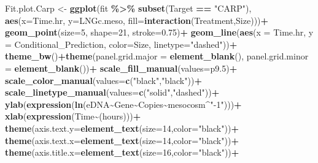 \documentclass[
]{article}
\newenvironment{Shaded}{\begin{snugshade}}{\end{snugshade}}
\newcommand{\AttributeTok}[1]{\textcolor[rgb]{0.13,0.29,0.53}{#1}}
\newcommand{\DecValTok}[1]{\textcolor[rgb]{0.00,0.00,0.81}{#1}}
\newcommand{\FloatTok}[1]{\textcolor[rgb]{0.00,0.00,0.81}{#1}}
\newcommand{\FunctionTok}[1]{\textcolor[rgb]{0.13,0.29,0.53}{\textbf{#1}}}
\newcommand{\NormalTok}[1]{#1}
\newcommand{\OtherTok}[1]{\textcolor[rgb]{0.56,0.35,0.01}{#1}}
\newcommand{\SpecialCharTok}[1]{\textcolor[rgb]{0.81,0.36,0.00}{\textbf{#1}}}
\newcommand{\StringTok}[1]{\textcolor[rgb]{0.31,0.60,0.02}{#1}}
\begin{document}
\begin{Shaded}
\begin{Highlighting}[]
\NormalTok{Fit.plot.Carp }\OtherTok{\textless{}{-}} \FunctionTok{ggplot}\NormalTok{(fit }\SpecialCharTok{\%\textgreater{}\%} \FunctionTok{subset}\NormalTok{(Target }\SpecialCharTok{==} \StringTok{"CARP"}\NormalTok{), }\FunctionTok{aes}\NormalTok{(}\AttributeTok{x=}\NormalTok{Time.hr, }\AttributeTok{y=}\NormalTok{LNGc.meso, }\AttributeTok{fill=}\FunctionTok{interaction}\NormalTok{(Treatment,Size)))}\SpecialCharTok{+}
  \FunctionTok{geom\_point}\NormalTok{(}\AttributeTok{size=}\DecValTok{5}\NormalTok{, }\AttributeTok{shape=}\DecValTok{21}\NormalTok{, }\AttributeTok{stroke=}\FloatTok{0.75}\NormalTok{)}\SpecialCharTok{+}
  \FunctionTok{geom\_line}\NormalTok{(}\FunctionTok{aes}\NormalTok{(}\AttributeTok{x =}\NormalTok{ Time.hr, }\AttributeTok{y =}\NormalTok{ Conditional\_Prediction, }\AttributeTok{color=}\NormalTok{Size, }\AttributeTok{linetype=}\StringTok{"dashed"}\NormalTok{))}\SpecialCharTok{+}
  \FunctionTok{theme\_bw}\NormalTok{()}\SpecialCharTok{+}\FunctionTok{theme}\NormalTok{(}\AttributeTok{panel.grid.major =} \FunctionTok{element\_blank}\NormalTok{(), }\AttributeTok{panel.grid.minor =} \FunctionTok{element\_blank}\NormalTok{())}\SpecialCharTok{+}
  \FunctionTok{scale\_fill\_manual}\NormalTok{(}\AttributeTok{values=}\NormalTok{p9}\FloatTok{.5}\NormalTok{)}\SpecialCharTok{+}
  \FunctionTok{scale\_color\_manual}\NormalTok{(}\AttributeTok{values=}\FunctionTok{c}\NormalTok{(}\StringTok{"black"}\NormalTok{,}\StringTok{"black"}\NormalTok{))}\SpecialCharTok{+}
  \FunctionTok{scale\_linetype\_manual}\NormalTok{(}\AttributeTok{values=}\FunctionTok{c}\NormalTok{(}\StringTok{"solid"}\NormalTok{,}\StringTok{"dashed"}\NormalTok{))}\SpecialCharTok{+}
  \FunctionTok{ylab}\NormalTok{(}\FunctionTok{expression}\NormalTok{(}\FunctionTok{ln}\NormalTok{(eDNA}\SpecialCharTok{\textasciitilde{}}\NormalTok{Gene}\SpecialCharTok{\textasciitilde{}}\NormalTok{Copies}\SpecialCharTok{\textasciitilde{}}\NormalTok{mesocosm}\SpecialCharTok{\^{}}\StringTok{"{-}1"}\NormalTok{)))}\SpecialCharTok{+}
  \FunctionTok{xlab}\NormalTok{(}\FunctionTok{expression}\NormalTok{(Time}\SpecialCharTok{\textasciitilde{}}\NormalTok{(hours)))}\SpecialCharTok{+}
  \FunctionTok{theme}\NormalTok{(}\AttributeTok{axis.text.y=}\FunctionTok{element\_text}\NormalTok{(}\AttributeTok{size=}\DecValTok{14}\NormalTok{,}\AttributeTok{color=}\StringTok{"black"}\NormalTok{))}\SpecialCharTok{+}
  \FunctionTok{theme}\NormalTok{(}\AttributeTok{axis.text.x=}\FunctionTok{element\_text}\NormalTok{(}\AttributeTok{size=}\DecValTok{14}\NormalTok{,}\AttributeTok{color=}\StringTok{"black"}\NormalTok{))}\SpecialCharTok{+}
  \FunctionTok{theme}\NormalTok{(}\AttributeTok{axis.title.x=}\FunctionTok{element\_text}\NormalTok{(}\AttributeTok{size=}\DecValTok{16}\NormalTok{,}\AttributeTok{color=}\StringTok{"black"}\NormalTok{))}\SpecialCharTok{+}

\end{Highlighting}
\end{Shaded}
\end{document}
